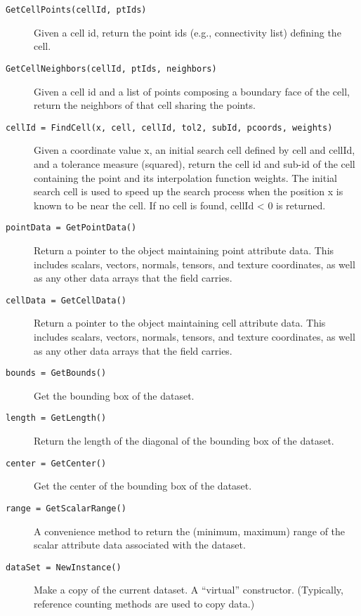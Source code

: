 \begin{description}[leftmargin=0cm,labelindent=0cm]
\begin{description}
    \item[\texttt{GetCellPoints(cellId, ptIds)}]
    Given a cell id, return the point ids (e.g., connectivity list) defining the cell.

    \item[\texttt{GetCellNeighbors(cellId, ptIds, neighbors)}]
    Given a cell id and a list of points composing a boundary face of the cell, return the neighbors of that cell sharing the points.

    \item[\texttt{cellId = FindCell(x, cell, cellId, tol2, subId, pcoords, weights)}] 
    Given a coordinate value x, an initial search cell defined by cell and cellId, and a tolerance measure (squared), return the cell id and sub-id of the cell containing the point and its interpolation function weights. The initial search cell is used to speed up the search process when the position x is known to be near the cell. If no cell is found, cellId < 0 is returned.

    \item[\texttt{pointData = GetPointData()}]
    Return a pointer to the object maintaining point attribute data. This includes scalars, vectors, normals, tensors, and texture coordinates, as well as any other data arrays that the field carries.

    \item[\texttt{cellData = GetCellData()}]
    Return a pointer to the object maintaining cell attribute data. This includes scalars, vectors, normals, tensors, and texture coordinates, as well as any other data arrays that the field carries.

    \item[\texttt{bounds = GetBounds()}]
    Get the bounding box of the dataset.

    \item[\texttt{length = GetLength()}]
    Return the length of the diagonal of the bounding box of the dataset.

    \item[\texttt{center = GetCenter()}]
    Get the center of the bounding box of the dataset.

    \item[\texttt{range = GetScalarRange()}]
    A convenience method to return the (minimum, maximum) range of the scalar attribute data associated with the dataset.

    \item[\texttt{dataSet = NewInstance()}]
    Make a copy of the current dataset. A ``virtual'' constructor. (Typically, reference counting methods are used to copy data.)


\end{description}
\end{description}
